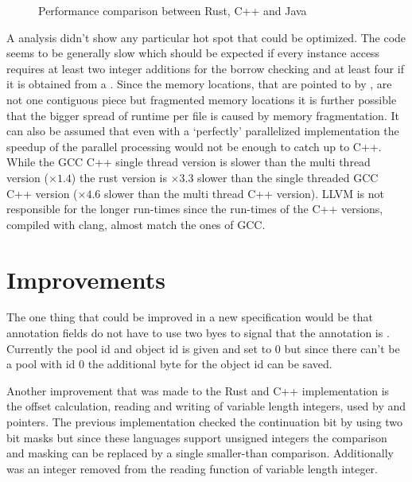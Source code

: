 \documentclass[thesis]{subfiles}
\begin{document}
  \begin{figure}[ht]
    \centering
    \hspace*{4em}



    \subfloat[Lograrithmic graph of all test files, with guide line $y=10x$.\label{fig:benchLog}]{}
    \caption{Performance comparison between Rust, C++ and Java}\label{fig:bench}
  \end{figure}

  A  analysis didn't show any particular hot spot that could be optimized.
  The code seems to be generally slow which should be expected if every \PtrT instance access requires at least two integer additions for the borrow checking and at least four if it is obtained from a \UserTypePool.
  Since the memory locations, that are pointed to by \PtrT, are not one contiguous piece but fragmented memory locations it is further possible that the bigger spread of runtime per file is caused by memory fragmentation.
  It can also be assumed that even with a `perfectly' parallelized implementation the speedup of the parallel processing would not be enough to catch up to C++.
  While the GCC C++ single thread version is slower than the multi thread version ($\times 1.4$) the rust version is $\times 3.3$ slower than the single threaded GCC C++ version ($\times 4.6$ slower than the multi thread C++ version).
  LLVM is not responsible for the longer run-times since the run-times of the C++ versions, compiled with clang, almost match the ones of GCC.

\section{ Improvements}
  The one thing that could be improved in a new specification would be that annotation fields do not have to use two byes to signal that the annotation is .
  Currently the pool id and object id is given and set to 0 but since there can't be a pool with id 0 the additional byte for the object id can be saved.

  Another improvement that was made to the Rust and C++ implementation is the offset calculation, reading and writing of variable length integers, used by  and pointers.
  The previous implementation checked the continuation bit by using two bit masks but since these languages support unsigned integers the comparison and masking can be replaced by a single smaller-than comparison.
  Additionally was an integer removed from the reading function of variable length integer.
\end{document}

